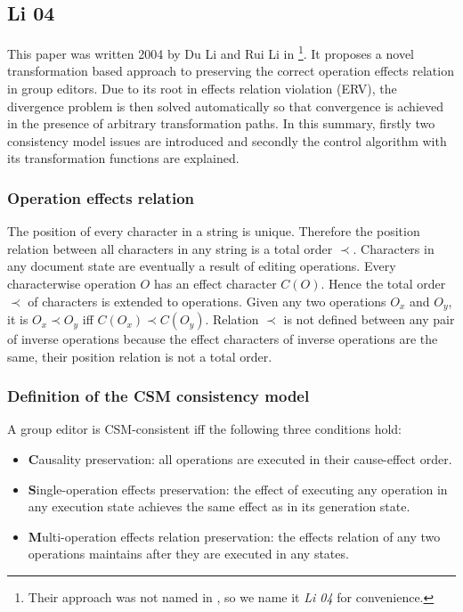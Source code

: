 \subsection{Li 04}
\label{algo:li04}

This paper was written 2004 by Du Li and Rui Li in \cite{li04} \footnote{Their approach was not named in \cite{li04}, so we name it \emph{Li 04} for convenience.}. It proposes a novel transformation based approach to preserving the correct operation effects relation in group editors. Due to its root in effects relation violation (ERV), the divergence problem is then solved automatically so that convergence is achieved in the presence of arbitrary transformation paths.
In this summary, firstly two consistency model issues are introduced and secondly the control algorithm with its transformation functions are explained.

\subsubsection{Operation effects relation}
The position of every character in a string is unique. Therefore the position relation between all characters in any string is a total order $\prec$. Characters in any document state are eventually a result of editing operations. Every characterwise operation $O$ has an effect character $C(O)$. Hence the total order $\prec$ of characters is extended to operations. Given any two operations $O_{x}$ and $O_{y}$, it is $O_{x} \prec O_{y}$ iff $C(O_{x}) \prec C(O_{y})$. Relation $\prec$ is not defined between any pair of inverse operations because the effect characters of inverse operations are the same, their position relation is not a total order.

\subsubsection{Definition of the CSM consistency model}
A group editor is CSM-consistent iff the following three conditions hold:
\begin{itemize}
 \item \textbf{C}ausality preservation: all operations are executed in their cause-effect order.
 \item \textbf{S}ingle-operation effects preservation: the effect of executing any operation in any execution state achieves the same effect as in its generation state.
 \item \textbf{M}ulti-operation effects relation preservation: the effects relation of any two operations maintains after they are executed in any states.
\end{itemize}

